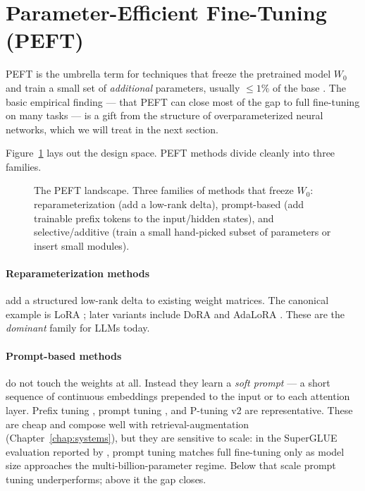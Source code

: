 \section{Parameter-Efficient Fine-Tuning (PEFT)}

PEFT is the umbrella term for techniques that freeze the pretrained
model $W_0$ and train a small set of \emph{additional} parameters,
usually $\leq 1\%$ of the base \citep{lialin2023peftsurvey}.
The basic empirical finding --- that PEFT can close most of the gap to
full fine-tuning on many tasks --- is a gift from the structure of
overparameterized neural networks, which we will treat in the next
section.

Figure~\ref{fig:peft-landscape} lays out the design space. PEFT
methods divide cleanly into three families.

\begin{figure}[ht]
  \centering
  
  \caption{The PEFT landscape. Three families of methods that freeze
  $W_0$: reparameterization (add a low-rank delta), prompt-based (add
  trainable prefix tokens to the input/hidden states), and
  selective/additive (train a small hand-picked subset of parameters
  or insert small modules).}
  \label{fig:peft-landscape}
\end{figure}

\paragraph{Reparameterization methods} add a structured low-rank delta
to existing weight matrices. The canonical example is LoRA
\citep{hu2021lora}; later variants include DoRA \citep{liu2024dora}
and AdaLoRA \citep{zhang2023adalora}. These are the \emph{dominant}
family for LLMs today.

\paragraph{Prompt-based methods} do not touch the weights at all.
Instead they learn a \emph{soft prompt} --- a short sequence of
continuous embeddings prepended to the input or to each attention
layer. Prefix tuning \citep{li2021prefix}, prompt tuning
\citep{lester2021prompt}, and P-tuning v2 \citep{liu2022ptuningv2} are
representative. These are cheap and compose well with
retrieval-augmentation (Chapter~\ref{chap:systems}), but they are sensitive to scale:
in the SuperGLUE evaluation reported by \citet{lester2021prompt},
prompt tuning matches full fine-tuning only as model size
approaches the multi-billion-parameter regime. Below that scale
prompt tuning underperforms; above it the gap closes.

